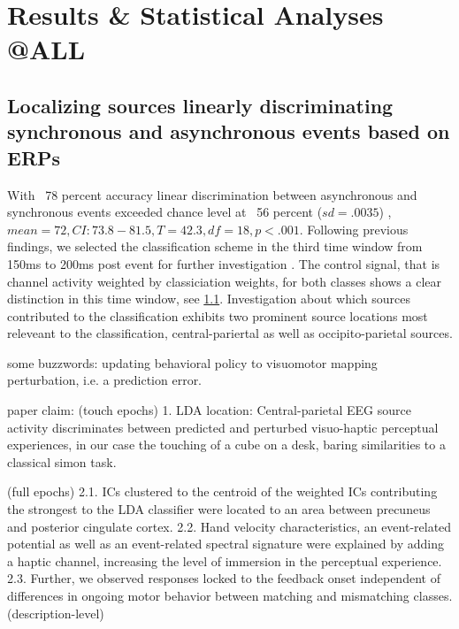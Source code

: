 \section{Results \& Statistical Analyses @ALL}
\subsection{Localizing sources linearly discriminating synchronous and asynchronous events based on ERPs}

With ~78 percent accuracy linear discrimination between asynchronous and synchronous events exceeded chance level at ~56 percent ($sd = .0035$) , $mean = 72, CI: 73.8 - 81.5  , T = 42.3, df = 18, p < .001$. Following previous findings, we selected the classification scheme in the third time window from 150ms to 200ms post event for further investigation \cite{Gehrke2019}. The control signal, that is channel activity weighted by classiciation weights, for both classes shows a clear distinction in this time window, see \ref{}. Investigation about which sources contributed to the classification exhibits two prominent source locations most releveant to the classification, central-pariertal as well as occipito-parietal sources. 


some buzzwords:
updating behavioral policy to 
visuomotor mapping
perturbation, i.e. a prediction error.

paper claim:
(touch epochs)
1. LDA location: Central-parietal EEG source activity discriminates between predicted and perturbed visuo-haptic perceptual experiences, in our case the touching of a cube on a desk, baring similarities to a classical simon task.

(full epochs)
2.1. ICs clustered to the centroid of the weighted ICs contributing the strongest to the LDA classifier were located to an area between precuneus and posterior cingulate cortex.
2.2. Hand velocity characteristics, an event-related potential as well as an event-related spectral signature were explained by adding a haptic channel, increasing the level of immersion in the perceptual experience.
2.3. Further, we observed responses locked to the feedback onset independent of differences in ongoing motor behavior between matching and mismatching classes. (description-level)

